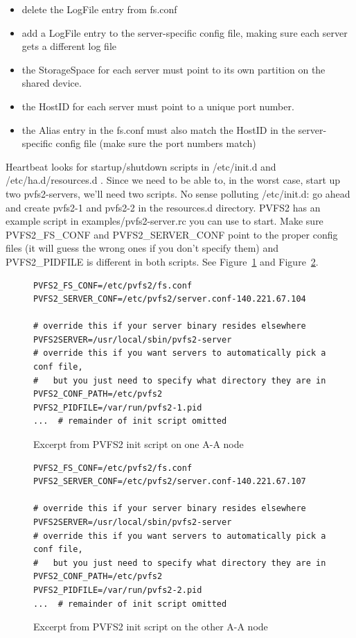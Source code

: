 \documentclass[11pt]{article}
\begin{document}
\begin{itemize}
	\item delete the LogFile entry from fs.conf
	\item add a LogFile entry to the server-specific config file, making
  	  sure each server gets a different log file
	\item the StorageSpace for each server must point to its own
 	  partition on the shared device.
	\item the HostID for each server must point to a unique port number.
	\item the Alias entry in the fs.conf must also match the HostID in
	  the server-specific config file (make sure the port numbers
	  match)
\end{itemize}

Heartbeat looks for startup/shutdown scripts in /etc/init.d and
/etc/ha.d/resources.d .  Since we need to be able to, in the worst case,
start up two pvfs2-servers, we'll need two scripts.  No sense
polluting /etc/init.d:  go ahead and create pvfs2-1 and pvfs2-2 in the
resources.d directory.  PVFS2 has an example script in
examples/pvfs2-server.rc you can use to start.  Make sure PVFS2\_FS\_CONF
and PVFS2\_SERVER\_CONF point to the proper config files (it will guess
the wrong ones if you don't specify them) and PVFS2\_PIDFILE is different
in both scripts.  See Figure~\ref{fig:init} and
Figure~\ref{fig:init-other}.

\begin{figure}
\begin{scriptsize}
\begin{verbatim}
PVFS2_FS_CONF=/etc/pvfs2/fs.conf
PVFS2_SERVER_CONF=/etc/pvfs2/server.conf-140.221.67.104
        
# override this if your server binary resides elsewhere
PVFS2SERVER=/usr/local/sbin/pvfs2-server
# override this if you want servers to automatically pick a conf file,
#   but you just need to specify what directory they are in
PVFS2_CONF_PATH=/etc/pvfs2
PVFS2_PIDFILE=/var/run/pvfs2-1.pid
...  # remainder of init script omitted
\end{verbatim}
\end{scriptsize}
\caption{Excerpt from PVFS2 init script on one A-A node}
\label{fig:init}
\end{figure}

\begin{figure}
\begin{scriptsize}
\begin{verbatim}
PVFS2_FS_CONF=/etc/pvfs2/fs.conf
PVFS2_SERVER_CONF=/etc/pvfs2/server.conf-140.221.67.107
        
# override this if your server binary resides elsewhere
PVFS2SERVER=/usr/local/sbin/pvfs2-server
# override this if you want servers to automatically pick a conf file,
#   but you just need to specify what directory they are in
PVFS2_CONF_PATH=/etc/pvfs2
PVFS2_PIDFILE=/var/run/pvfs2-2.pid
...  # remainder of init script omitted
\end{verbatim}
\end{scriptsize}
\caption{Excerpt from PVFS2 init script on the other A-A node}
\label{fig:init-other}
\end{figure}
\end{document}
